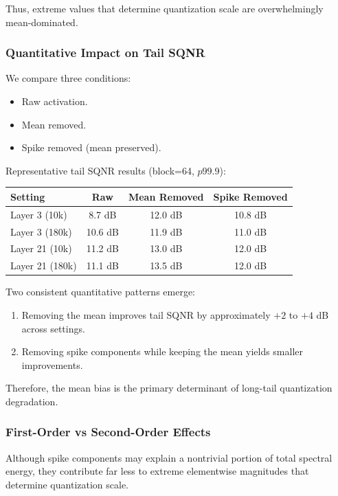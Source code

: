 Thus, extreme values that determine quantization scale
are overwhelmingly mean-dominated.

\subsubsection{Quantitative Impact on Tail SQNR}

We compare three conditions:

\begin{itemize}
\item Raw activation.
\item Mean removed.
\item Spike removed (mean preserved).
\end{itemize}

Representative tail SQNR results (block=64, $p99.9$):

\begin{center}
\begin{tabular}{lccc}
\toprule
Setting & Raw & Mean Removed & Spike Removed \\
\midrule
Layer 3 (10k)   & 8.7 dB  & 12.0 dB  & 10.8 dB \\
Layer 3 (180k)  & 10.6 dB & 11.9 dB  & 11.0 dB \\
Layer 21 (10k)  & 11.2 dB & 13.0 dB  & 12.0 dB \\
Layer 21 (180k) & 11.1 dB & 13.5 dB  & 12.0 dB \\
\bottomrule
\end{tabular}
\end{center}

Two consistent quantitative patterns emerge:

\begin{enumerate}
\item Removing the mean improves tail SQNR by approximately
$+2$ to $+4$ dB across settings.
\item Removing spike components while keeping the mean yields
smaller improvements.
\end{enumerate}

Therefore, the mean bias is the primary determinant
of long-tail quantization degradation.

\subsubsection{First-Order vs Second-Order Effects}

Although spike components may explain a nontrivial portion
of total spectral energy,
they contribute far less to extreme elementwise magnitudes
that determine quantization scale.


